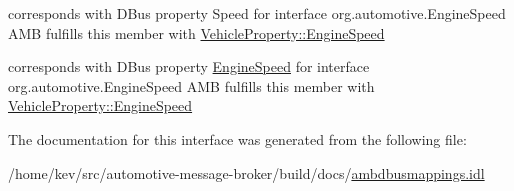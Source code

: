 corresponds with D\+Bus property Speed for interface org.\+automotive.\+Engine\+Speed A\+M\+B fulfills this member with \hyperlink{classVehicleProperty_a7949fe3d031814fc2644de14f8cec9a0}{Vehicle\+Property\+::\+Engine\+Speed} 

corresponds with D\+Bus property \hyperlink{interfaceEngineSpeed}{Engine\+Speed} for interface org.\+automotive.\+Engine\+Speed A\+M\+B fulfills this member with \hyperlink{classVehicleProperty_a7949fe3d031814fc2644de14f8cec9a0}{Vehicle\+Property\+::\+Engine\+Speed} 

The documentation for this interface was generated from the following file\+:\begin{DoxyCompactItemize}
\item 
/home/kev/src/automotive-\/message-\/broker/build/docs/\hyperlink{ambdbusmappings_8idl}{ambdbusmappings.\+idl}\end{DoxyCompactItemize}
